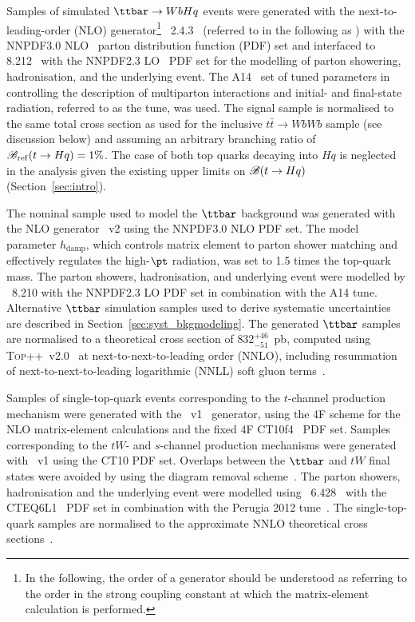 Samples of simulated $\ttbar \to WbHq$ events were generated with the next-to-leading-order (NLO) generator\footnote{In the following, 
the order of a generator should be understood as referring to the order in the strong coupling constant at which the matrix-element calculation 
is performed.} {\amcatnlolong}~2.4.3~\cite{Alwall:2014hca}  (referred to in the following as {\amcatnlo}) with the NNPDF3.0 NLO~\cite{Ball:2014uwa} parton distribution function (PDF) set and interfaced to {\pythia} 8.212~\cite{Sjostrand:2007gs} with the NNPDF2.3 LO~\cite{Ball:2012cx} PDF set for the modelling of parton showering, hadronisation, and the underlying event. 
The A14~\cite{ATLASUETune4} set of tuned parameters in {\pythia} controlling the description of multiparton interactions and  
initial- and final-state radiation, referred to as the tune, was used.
The signal sample is normalised to the same total cross section as used for the inclusive $t\bar{t}\to WbWb$ sample (see discussion below) and
assuming an arbitrary branching ratio of $\mathscr{B}_{\mathrm{ref}}(t\to Hq)=1\%$.
The case of both top quarks decaying into $Hq$ is neglected in the analysis given the existing upper limits on $\mathscr{B}(t \to Hq)$ (Section~\ref{sec:intro}).

The nominal sample used to model the $\ttbar$ background was generated with the NLO generator {\powheg}~v2 \cite{Frixione:2007nw,Nason:2004rx,Frixione:2007vw,Alioli:2010xd} using the NNPDF3.0 NLO PDF set. The {\powheg} model parameter $h_{\textrm{damp}}$, which controls 
matrix element to parton shower matching and effectively regulates the high-$\pt$ radiation, was set to 1.5 times the top-quark mass. 
The parton showers, hadronisation, and underlying event were modelled by {\pythia}~8.210 with the NNPDF2.3 LO PDF set in combination with the A14 tune.
Alternative $\ttbar$ simulation samples used to derive systematic uncertainties are described in Section~\ref{sec:syst_bkgmodeling}. 
The generated $\ttbar$ samples are normalised to a theoretical cross section of $832^{+46}_{-51}$~pb, 
computed using \textsc{Top++}~v2.0~\cite{Czakon:2011xx} at next-to-next-to-leading order (NNLO), 
including resummation of next-to-next-to-leading logarithmic (NNLL) soft gluon 
terms~\cite{Cacciari:2011hy,Baernreuther:2012ws,Czakon:2012zr,Czakon:2012pz,Czakon:2013goa}.

Samples of single-top-quark events corresponding to the $t$-channel production mechanism were generated with the 
{\powheg}~v1~\cite{Frederix:2012dh} generator, using the 4F scheme  for the NLO matrix-element calculations
and the fixed 4F \textsc{CT10}f\textsc{4}~\cite{Lai:2010vv} PDF set.
Samples corresponding to the $tW$- and $s$-channel production mechanisms were generated 
with {\powheg}~v1 using the CT10 PDF set. Overlaps between the $\ttbar$ and $tW$ final states were avoided by using 
the diagram removal scheme~\cite{Frixione:2005vw}.
The parton showers, hadronisation and the underlying event were modelled using {\pythia}~6.428~\cite{Sjostrand:2006za} 
with the CTEQ6L1~\cite{Pumplin:2002vw,Nadolsky:2008zw} PDF set 
in combination with the Perugia 2012 tune~\cite{Skands:2010ak}.
The single-top-quark samples are normalised to the approximate NNLO theoretical cross 
sections~\cite{Kidonakis:2011wy,Kidonakis:2010ux,Kidonakis:2010tc}. 

